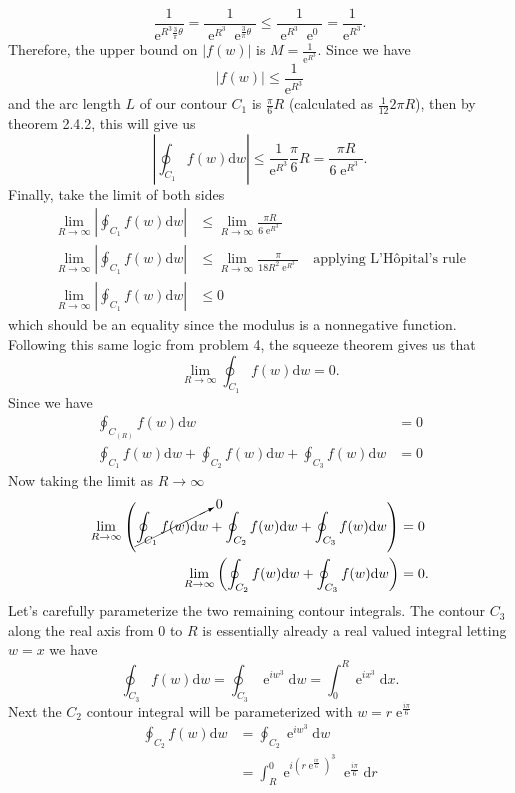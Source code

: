 \documentclass[10pt]{amsart}
\newcommand{\D}{\mathrm{d}}
\DeclareMathOperator{\E}{e}
\theoremstyle{nonumberplain}
\begin{document}
\begin{enumerate}[label={\bf {\arabic*}:}]
$$
\frac 1 {\E^{R^3\frac 3 \pi \theta}} = \frac 1 {\E^{R^3}\E^{\frac 3 \pi \theta}} \leq \frac 1 {\E^{R^3}\E^{0}} = \frac 1 {\E^{R^3}}.
$$
Therefore, the upper bound on $\left|f(w)\right|$ is $M = \frac 1 {\E^{R^3}}$.
Since we have
$$\left| f(w) \right| \leq \frac 1 {\E^{R^3}}$$
and the arc length $L$ of our contour $C_1$ is $\frac \pi 6 R$ (calculated as $\frac 1 {12} 2\pi R$), then by theorem 2.4.2, this will give us
$$
\left| \oint_{C_1} f(w) \D w\right| \leq \frac 1 {\E^{R^3}} \frac \pi 6 R = \frac {\pi R} {6\E^{R^3}} .
$$
Finally, take the limit of both sides 
\begin{align*}
\lim_{R \rightarrow \infty}\left| \oint_{C_1} f(w) \D w\right| &\leq \lim_{R \rightarrow \infty} \frac {\pi R} {6\E^{R^3}} \\
\lim_{R \rightarrow \infty}\left| \oint_{C_1} f(w) \D w\right| &\leq \lim_{R \rightarrow \infty} \frac {\pi} {18R^2\E^{R^3}} \quad \text{applying L'Hôpital's rule} \\
\lim_{R \rightarrow \infty}\left| \oint_{C_1} f(w) \D w\right| &\leq 0
\end{align*}
which should be an equality since the modulus is a nonnegative function.
Following this same logic from problem 4, the squeeze theorem gives us that
$$
\lim_{R \rightarrow \infty} \oint_{C_1} f(w) \D w = 0.
$$
Since we have
\begin{align*}
\oint_{C_{(R)}} f(w) \D w &= 0 \\
\oint_{C_{1}} f(w) \D w + \oint_{C_{2}} f(w) \D w + \oint_{C_{3}} f(w) \D w &=0
\end{align*}
Now taking the limit as $R\rightarrow\infty$
\begin{align}
\lim_{R\rightarrow\infty}\left(\cancelto{0}{\oint_{C_{1}} f(w) \D w} + \oint_{C_{2}} f(w) \D w + \oint_{C_{3}} f(w) \D w \right) &=0 \nonumber \\
\lim_{R\rightarrow\infty}\left(\oint_{C_{2}} f(w) \D w + \oint_{C_{3}} f(w) \D w \right) &=0.
\label{eq:last}
\end{align}
Let's carefully parameterize the two remaining contour integrals. The contour $C_3$ along the real axis from $0$ to $R$ is essentially already a real valued integral letting $w = x$ we have
$$
\oint_{C_{3}} f(w) \D w = \oint_{C_{3}} \E^{iw^3} \D w = \int_{0}^{R} \E^{ix^3} \D x.
$$
Next the $C_2$ contour integral will be parameterized with $w = r\E^{\frac{i\pi}{6}}$
\begin{align*}
\oint_{C_{2}} f(w) \D w
	&= \oint_{C_{2}} \E^{iw^3} \D w \\
	&= \int_{R}^{0} \E^{i\left(r\E^{\frac{i\pi}{6}}\right)^3} \E^{\frac{i\pi}{6}} \D r \\

\end{align*}
\end{enumerate}
\end{document}
